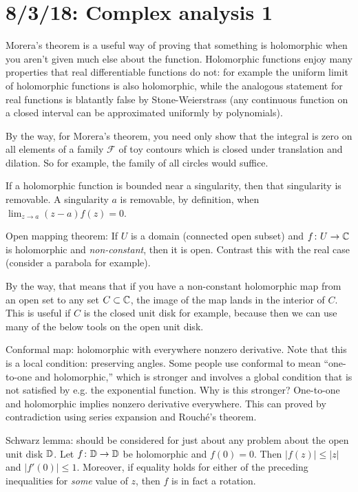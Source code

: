 \section{8/3/18: Complex analysis 1}
Morera's theorem is a useful way of proving that something is holomorphic when you aren't given much else about the function. Holomorphic functions enjoy many properties that real differentiable functions do not: for example the uniform limit of holomorphic functions is also holomorphic, while the analogous statement for real functions is blatantly false by Stone-Weierstrass (any continuous function on a closed interval can be approximated uniformly by polynomials).

By the way, for Morera's theorem, you need only show that the integral is zero on all elements of a family $\mathcal{F}$ of toy contours which is closed under translation and dilation. So for example, the family of all circles would suffice.

If a holomorphic function is bounded near a singularity, then that singularity is removable. A singularity $a$ is removable, by definition, when $\lim_{z\to a} (z-a)f(z) = 0$.

Open mapping theorem: If $U$ is a domain (connected open subset) and $f\colon U\to \mathbb{C}$ is holomorphic and \emph{non-constant}, then it is open. Contrast this with the real case (consider a parabola for example).

By the way, that means that if you have a non-constant holomorphic map from an open set to any set $C\subset\mathbb{C}$, the image of the map lands in the interior of $C$. This is useful if $C$ is the closed unit disk for example, because then we can use many of the below tools on the open unit disk.

Conformal map: holomorphic with everywhere nonzero derivative. Note that this is a local condition: preserving angles. Some people use conformal to mean ``one-to-one and holomorphic,'' which is stronger and involves a global condition that is not satisfied by e.g. the exponential function. Why is this stronger? One-to-one and holomorphic implies nonzero derivative everywhere. This can proved by contradiction using series expansion and Rouch\'e's theorem.

Schwarz lemma: should be considered for just about any problem about the open unit disk $\mathbb{D}$. Let $f\colon \mathbb{D} \to \mathbb{D}$ be holomorphic and $f(0)=0$. Then $|f(z)| \leq |z|$ and $|f'(0)| \leq 1$. Moreover, if equality holds for either of the preceding inequalities for \emph{some} value of $z$, then $f$ is in fact a rotation.

